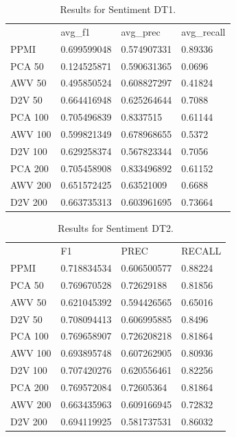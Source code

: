 \begin{table}[]
	\begin{tabular}{llll}
		& avg\_f1     & avg\_prec   & avg\_recall \\
		PPMI    & 0.699599048 & 0.574907331 & 0.89336     \\
		PCA 50  & 0.124525871 & 0.590631365 & 0.0696      \\
		AWV 50  & 0.495850524 & 0.608827297 & 0.41824     \\
		D2V 50  & 0.664416948 & 0.625264644 & 0.7088      \\
		PCA 100 & 0.705496839 & 0.8337515   & 0.61144     \\
		AWV 100 & 0.599821349 & 0.678968655 & 0.5372      \\
		D2V 100 & 0.629258374 & 0.567823344 & 0.7056      \\
		PCA 200 & 0.705458908 & 0.833496892 & 0.61152     \\
		AWV 200 & 0.651572425 & 0.63521009  & 0.6688      \\
		D2V 200 & 0.663735313 & 0.603961695 & 0.73664    
	\end{tabular}
	\caption{Results for Sentiment DT1.}
	\label{table:Newsgroups}
\end{table}

\begin{table}[]
	\begin{tabular}{llll}
		& F1          & PREC        & RECALL  \\
		PPMI    & 0.718834534 & 0.606500577 & 0.88224 \\
		PCA 50  & 0.769670528 & 0.72629188  & 0.81856 \\
		AWV 50  & 0.621045392 & 0.594426565 & 0.65016 \\
		D2V 50  & 0.708094413 & 0.606995885 & 0.8496  \\
		PCA 100 & 0.769658907 & 0.726208218 & 0.81864 \\
		AWV 100 & 0.693895748 & 0.607262905 & 0.80936 \\
		D2V 100 & 0.707420276 & 0.620556461 & 0.82256 \\
		PCA 200 & 0.769572084 & 0.72605364  & 0.81864 \\
		AWV 200 & 0.663435963 & 0.609166945 & 0.72832 \\
		D2V 200 & 0.694119925 & 0.581737531 & 0.86032
	\end{tabular}
	\caption{Results for Sentiment DT2.}
	\label{table:Newsgroups}
\end{table}

